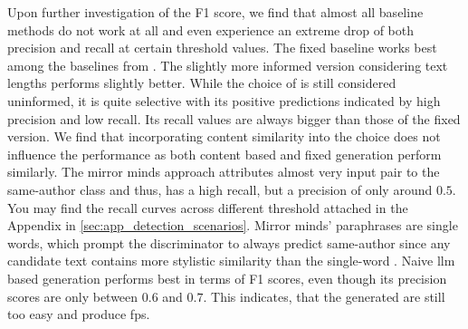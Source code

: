 Upon further investigation of the F1 score, we find that almost all baseline methods do not work at all and even experience an extreme drop of both precision and recall at certain threshold values.
The fixed baseline works best among the baselines from \citet{koppel_determining_2014}.
The slightly more informed version considering text lengths performs slightly better.
While the choice of \imps{} is still considered uninformed, it is quite selective with its positive predictions indicated by high precision and low recall. 
Its recall values are always bigger than those of the fixed version.
We find that incorporating content similarity into the \imp{} choice does not influence the performance as both content based and fixed \imp{} generation perform similarly.
The mirror minds approach attributes almost very input pair to the same-author class and thus, has a high recall, but a precision of only around $0.5$.
You may find the recall curves across different threshold attached in the Appendix in \autoref{sec:app_detection_scenarios}.
Mirror minds' paraphrases are single words, which prompt the discriminator to always predict same-author since any candidate text contains more stylistic similarity than the single-word \imps{}.
Naive \ac{llm} based \imp{} generation performs best in terms of F1 scores, even though its precision scores are only between $0.6$ and $0.7$.
This indicates, that the generated \imps{} are still too easy and produce \acp{fp}.



%     


%     
